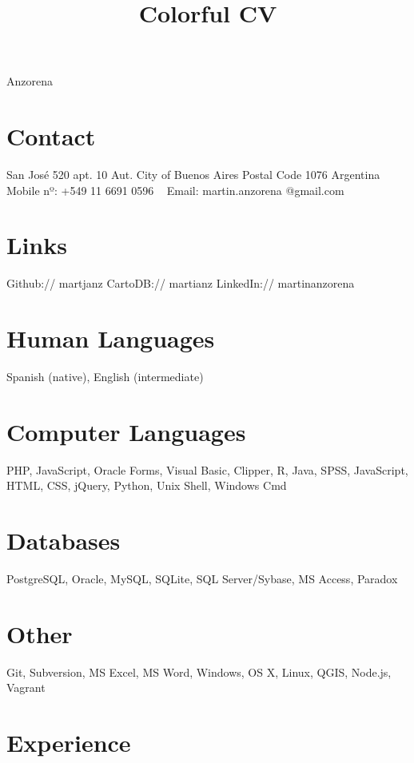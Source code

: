 \documentclass[]{cv-style}          %
\begin{document}
\title{Colorful CV}

 {Anzorena}           %
\lastupdated


\begin{aside}
%
\section{Contact}
San José 520 apt. 10
Aut. City of Buenos Aires
Postal Code 1076
Argentina
~
Mobile nº:
+549 11 6691 0596
~
Email:
martin.anzorena
@gmail.com
%
\section{Links} 
Github:// martjanz
CartoDB:// martianz
LinkedIn:// martinanzorena
%
\section{Human
Languages}
Spanish (native),
English (intermediate)
%
\section{Computer
   Languages}
PHP, JavaScript,
Oracle Forms,
Visual Basic,
Clipper, R,
Java, SPSS,
JavaScript,
HTML, CSS,
jQuery, Python,
Unix Shell,
Windows Cmd
%
\section{Databases}
PostgreSQL, Oracle,
MySQL, SQLite,
SQL Server/Sybase,
MS Access, Paradox
%
\section{Other}
Git, Subversion,
MS Excel, MS Word,
Windows, OS X,
Linux, QGIS,
Node.js, Vagrant
%
\end{aside}


{\vspace{+0.4cm}}
\section{Experience}
\end{document}
